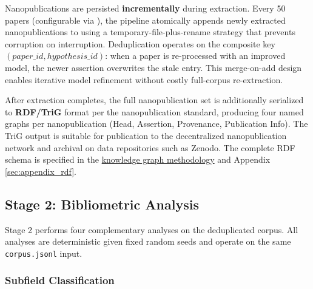 \documentclass[
  english,
]{article}
\begin{document}
Nanopublications are persisted \textbf{incrementally} during extraction.
Every 50 papers (configurable via ), the
pipeline atomically appends newly extracted nanopublications to
 using a temporary-file-plus-rename
strategy that prevents corruption on interruption. Deduplication
operates on the composite key \((paper\_id, hypothesis\_id)\): when a
paper is re-processed with an improved model, the newer assertion
overwrites the stale entry. This merge-on-add design enables iterative
model refinement without costly full-corpus re-extraction.

After extraction completes, the full nanopublication set is additionally
serialized to \textbf{RDF/TriG} format per the nanopublication standard,
producing four named graphs per nanopublication (Head, Assertion,
Provenance, Publication Info). The TriG output is suitable for
publication to the decentralized nanopublication network and archival on
data repositories such as Zenodo. The complete RDF schema is specified
in the \hyperref[sec:methods_kg]{knowledge graph methodology} and
Appendix \ref{sec:appendix_rdf}.

\newpage

\subsection{\texorpdfstring{Stage 2: Bibliometric Analysis
\label{sec:methods_bibliometrics}}{Stage 2: Bibliometric Analysis}}\label{stage-2-bibliometric-analysis}

Stage 2 performs four complementary analyses on the deduplicated corpus.
All analyses are deterministic given fixed random seeds and operate on
the same \texttt{corpus.jsonl} input.

\subsubsection{Subfield Classification}\label{subfield-classification}
\end{document}
